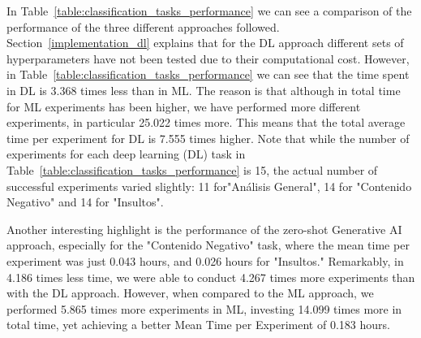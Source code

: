 In Table~\ref{table:classification_tasks_performance} we can see a comparison of the performance of the three different approaches followed. Section~\ref{implementation_dl} explains that for the DL approach different sets of hyperparameters have not been tested due to their computational cost. However, in Table~\ref{table:classification_tasks_performance} we can see that the time spent in DL is 3.368 times less than in ML. The reason is that although in total time for ML experiments has been higher, we have performed more different experiments, in particular 25.022 times more. This means that the total average time per experiment for DL is 7.555 times higher. Note that while the number of experiments for each deep learning (DL) task in Table~\ref{table:classification_tasks_performance} is 15, the actual number of successful experiments varied slightly: 11 for"Análisis General", 14 for "Contenido Negativo" and 14 for "Insultos". 

Another interesting highlight is the performance of the zero-shot Generative AI approach, especially for the "Contenido Negativo" task, where the mean time per experiment was just 0.043 hours, and 0.026 hours for "Insultos." Remarkably, in 4.186 times less time, we were able to conduct 4.267 times more experiments than with the DL approach. However, when compared to the ML approach, we performed 5.865 times more experiments in ML, investing 14.099 times more in total time, yet achieving a better Mean Time per Experiment of 0.183 hours.


